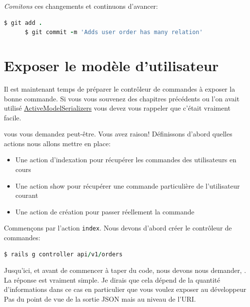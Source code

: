 \documentclass[]{report}
\begin{document}
    \textit{Comitons} ces changements et continuons d'avancer:

    \begin{scriptsize}
      \begin{lstlisting}[language=ruby]
      $ git add .
      $ git commit -m 'Adds user order has many relation'
      \end{lstlisting}
    \end{scriptsize}

  \section{Exposer le modèle d'utilisateur}

    Il est maintenant temps de préparer le contrôleur de commandes à exposer la bonne commande. Si vous vous souvenez des chapitres précédents ou l'on avait utilisé \href{https://github.com/rails-api/active_model_serializers}{ActiveModelSerializers} vous devez vous rappeler que c'était vraiment facile.

     vous vous demandez peut-être. Vous avez raison! Définissons d'abord quelles actions nous allons mettre en place:

    \begin{itemize}
      \item Une action d'indexation pour récupérer les commandes des utilisateurs en cours
      \item Une action show pour récupérer une commande particulière de l'utilisateur courant
      \item Une action de création pour passer réellement la commande
    \end{itemize}


    Commençons par l'action \verb|index|. Nous devons d'abord créer le contrôleur de commandes:

    \begin{scriptsize}
      \begin{lstlisting}[language=ruby]
      $ rails g controller api/v1/orders
      \end{lstlisting}
    \end{scriptsize}

    Jusqu'ici, et avant de commencer à taper du code, nous devons nous demander, . La réponse est vraiment simple. Je dirais que cela dépend de la quantité d'informations dans ce cas en particulier que vous voulez exposer au développeur Pas du point de vue de la sortie JSON mais au niveau de l'URI.
\end{document}
